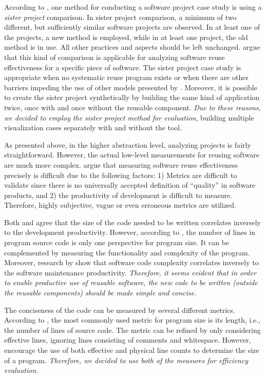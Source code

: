According to \citet{kitchenham_evaluating_1998}, one method for conducting a software project case study is using a \emph{sister project} comparison. In sister project comparison, a minimum of two different, but sufficiently similar software projects are observed. In at least one of the projects, a new method is employed, while in at least one project, the old method is in use. All other practices and aspects should be left unchanged. \citet{mohagheghi_quality_2007} argue that this kind of comparison is applicable for analyzing software reuse effectiveness for a specific piece of software. The sister project case study is appropriate when no systematic reuse program exists or when there are other barriers impeding the use of other models presented by \citet{mohagheghi_quality_2007}. Moreover, it is possible to create the sister project synthetically by building the same kind of application twice, once with and once without the reusable component. \emph{Due to these reasons, we decided to employ the sister project method for evaluation}, building multiple visualization cases separately with and without the tool.

As presented above, in the higher abstraction level, analyzing projects is fairly straightforward. However, the actual low-level measurements for reusing software are much more complex. \citet{mohagheghi_quality_2007} argue that measuring software reuse effectiveness precisely is difficult due to the following factors: 1) Metrics are difficult to validate since there is no universally accepted definition of ``quality'' in software products, and 2) the productivity of development is difficult to measure. Therefore, highly subjective, vague or even erroneous metrics are utilized.

Both \citet{frakes_software_1996} and \citet{mohagheghi_quality_2007} agree that the size of the code needed to be written correlates inversely to the development productivity. However, according to \citet{fenton_software_1998}, the number of lines in program source code is only one perspective for program size. It can be complemented by measuring the functionality and complexity of the program. Moreover, research by \citet{banker_software_1993,gill_cyclomatic_1991} show that software code complexity correlates inversely to the software maintenance productivity. \emph{Therefore, it seems evident that in order to enable productive use of reusable software, the new code to be written (outside the reusable components) should be made simple and concise.}

The conciseness of the code can be measured by several different metrics. According to \citet{fenton_software_1998}, the most commonly used metric for program size is its length, i.e., the number of lines of source code. The metric can be refined by only considering effective lines, ignoring lines consisting of comments and whitespace. However, \citet{fenton_software_1998} encourage the use of both effective and physical line counts to determine the size of a program. \emph{Therefore, we decided to use both of the measures for efficiency evaluation.}

